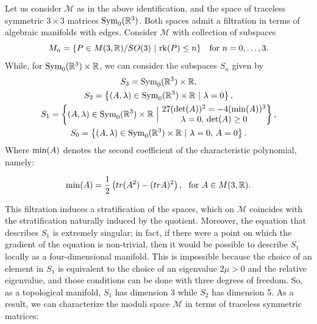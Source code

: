 \documentclass{article}
\numberwithin{equation}{section}
\theoremstyle{definition}
\newcommand{\R}{\mathbb{R}}
\newcommand{\M}{\mathcal{M}}
\begin{document}
Let us consider $\M$ as in the above identification, and the space of traceless symmetric $3\times 3$ matrices ${\rm Sym}_0(\R^3)$. Both spaces admit a filtration in terms of algebraic manifolds with edges. Consider $\M$ with collection of subspaces \[M_n=\{P\in M(3,\R)/SO(3)\ |\ {\rm rk}(P)\leq n\} \quad \mbox{for } n=0,\dots,3.\]
While, for ${\rm Sym}_0(\R^3)\times \R$, we can consider the subspaces $S_n$ given by \begin{gather*}
    S_3={\rm Sym}_0(\R^3)\times \R,\\ 
    S_2=\left\{(A,\lambda)\in {\rm Sym}_0(\R^3)\times \R\ |\ \lambda=0\right\},\\
    S_1=\left\{(A,\lambda)\in{\rm Sym}_0(\R^3)\times \R\ \Big|\ \begin{matrix}
        27(\det(A))^2=-4({\rm min}(A))^3\\
        \lambda=0,\,\det(A)\geq0
    \end{matrix}\right\},\\ 
    S_0=\left\{(A,\lambda)\in{\rm Sym}_0(\R^3)\times \R\ |\ \lambda=0,\,A=0\right\}.
\end{gather*}
Where ${\rm min} (A)$ denotes the second coefficient of the characteristic polynomial, namely: 

\[{\rm min}(A)=\frac{1}{2}\left(tr(A^2)-(trA)^2\right),\ \text{ for $A\in M(3,\R)$.}\]


This filtration induces a stratification of the spaces, which on $\M$ coincides with the stratification naturally induced by the quotient. Moreover, the equation that describes $S_1$ is extremely singular; in fact, if there were a point on which the gradient of the equation is non-trivial, then it would be possible to describe $S_1$ locally as a four-dimensional manifold. This is impossible because the choice of an element in $S_1$ is equivalent to the choice of an eigenvalue $2\mu >0$ and the relative eigenvalue, and those conditions can be done with three degrees of freedom. So, as a topological manifold, $S_1$ has dimension 3 while $S_2$ has dimension 5. As a result, we can characterize the moduli space $\M$ in terms of traceless symmetric matrices:
\end{document}
